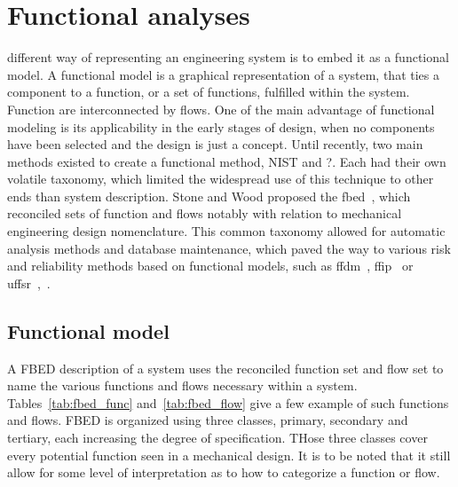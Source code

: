 %
%
\let\textcircled=\pgftextcircled
\chapter{Functional analyses}
\label{chap:fm}


 different way of representing an engineering system is to embed it as a functional model. A functional model is a graphical representation of a system, that ties a component to a function, or a set of functions, fulfilled within the system. Function are interconnected by flows. One of the main advantage of functional modeling is its applicability in the early stages of design, when no components have been selected and the design is just a concept. Until recently, two main methods existed to create a functional method, NIST and ?. Each had their own volatile taxonomy, which limited the widespread use of this technique to other ends than system description. Stone and Wood proposed the \gls{fbed}~\cite{stone}, which reconciled sets of function and flows notably with relation to mechanical engineering design nomenclature. This common taxonomy allowed for automatic analysis methods and database maintenance, which paved the way to various risk and reliability methods based on functional models, such as \gls{ffdm}~\cite{stone2005}, \gls{ffip}~\cite{kurtoglu2007} or \gls{uffsr}~\cite{vanbossuyt2014},~\cite{ohalloran2015}.


\section{Functional model}

A FBED description of a system uses the reconciled function set and flow set to name the various functions and flows necessary within a system. Tables~\ref{tab:fbed_func} and~\ref{tab:fbed_flow} give a few example of such functions and flows. FBED is organized using three classes, primary, secondary and tertiary, each increasing the degree of specification. THose three classes cover every potential function seen in a mechanical design. It is to be noted that it still allow for some level of interpretation as to how to categorize a function or flow.

